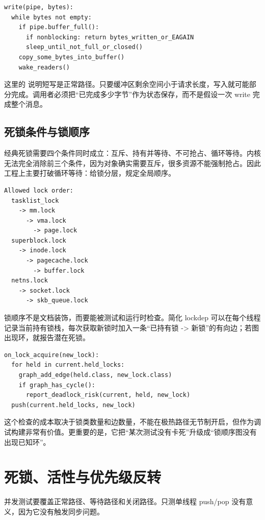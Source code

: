 \begin{lstlisting}
write(pipe, bytes):
  while bytes not empty:
    if pipe.buffer_full():
      if nonblocking: return bytes_written_or_EAGAIN
      sleep_until_not_full_or_closed()
    copy_some_bytes_into_buffer()
    wake_readers()
\end{lstlisting}

这里的  说明短写是正常路径。只要缓冲区剩余空间小于请求长度，写入就可能部分完成。调用者必须把“已完成多少字节”作为状态保存，而不是假设一次 write 完成整个消息。

\subsection{死锁条件与锁顺序}

经典死锁需要四个条件同时成立：互斥、持有并等待、不可抢占、循环等待。内核无法完全消除前三个条件，因为对象确实需要互斥，很多资源不能强制抢占。因此工程上主要打破循环等待：给锁分层，规定全局顺序。

\begin{lstlisting}
Allowed lock order:
  tasklist_lock
    -> mm.lock
      -> vma.lock
        -> page.lock
  superblock.lock
    -> inode.lock
      -> pagecache.lock
        -> buffer.lock
  netns.lock
    -> socket.lock
      -> skb_queue.lock
\end{lstlisting}

锁顺序不是文档装饰，而要能被测试和运行时检查。简化 lockdep 可以在每个线程记录当前持有锁栈，每次获取新锁时加入一条“已持有锁 -> 新锁”的有向边；若图出现环，就报告潜在死锁。

\begin{lstlisting}
on_lock_acquire(new_lock):
  for held in current.held_locks:
    graph_add_edge(held.class, new_lock.class)
    if graph_has_cycle():
      report_deadlock_risk(current, held, new_lock)
  push(current.held_locks, new_lock)
\end{lstlisting}

这个检查的成本取决于锁类数量和边数量，不能在极热路径无节制开启，但作为调试构建非常有价值。更重要的是，它把“某次测试没有卡死”升级成“锁顺序图没有出现已知环”。

\section{死锁、活性与优先级反转}

并发测试要覆盖正常路径、等待路径和关闭路径。只测单线程 push/pop 没有意义，因为它没有触发同步问题。

